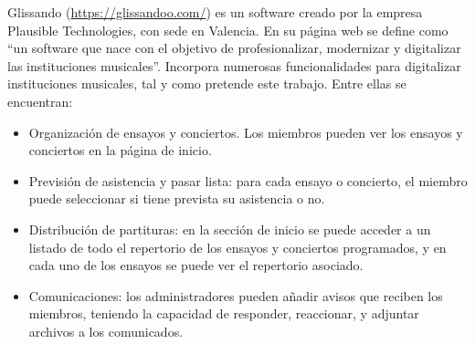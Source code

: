 Glissando (\url{https://glissandoo.com/}) es un software creado por la empresa Plausible Technologies, con sede en Valencia. En su página web se define como ``un software que nace con el objetivo de profesionalizar, modernizar y digitalizar las instituciones musicales''. Incorpora numerosas funcionalidades para digitalizar instituciones musicales, tal y como pretende este trabajo. Entre ellas se encuentran:

\begin{itemize}
    \item Organización de ensayos y conciertos. Los miembros pueden ver los ensayos y conciertos en la página de inicio.
    \item Previsión de asistencia y pasar lista: para cada ensayo o concierto, el miembro puede seleccionar si tiene prevista su asistencia o no.
    \item Distribución de partituras: en la sección de inicio se puede acceder a un listado de todo el repertorio de los ensayos y conciertos programados, y en cada uno de los ensayos se puede ver el repertorio asociado.
    \item Comunicaciones: los administradores pueden añadir avisos que reciben los miembros, teniendo la capacidad de responder, reaccionar, y adjuntar archivos a los comunicados.
\end{itemize}

